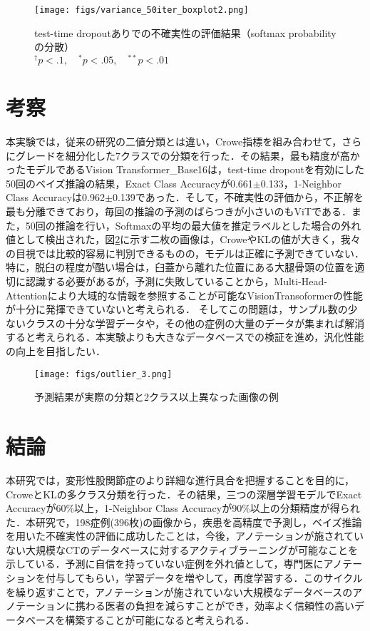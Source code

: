 \documentclass[technicalreport]{ieicej}
\begin{document}
\begin{figure}[h]
\capwidth=60mm
\vspace{50mm}
\texttt{[image: figs/variance\_50iter\_boxplot2.png]}
\caption{test-time dropoutありでの不確実性の評価結果（softmax probabilityの分散）\\$^{\dagger}p<.1,\quad^{*}p<.05,\quad^{**}p<.01$}
\label{fig:total_boxplot2}
\end{figure}

\section{考察}
本実験では，従来の研究の二値分類とは違い，Crowe指標を組み合わせて，さらにグレードを細分化した7クラスでの分類を行った．その結果，最も精度が高かったモデルであるVision Transformer\_Base16は，test-time dropoutを有効にした50回のベイズ推論の結果，Exact Class Accuracyが0.661$\pm$0.133，1-Neighbor Class Accuracyは0.962$\pm$0.139であった．そして，不確実性の評価から，不正解を最も分離できており，毎回の推論の予測のばらつきが小さいのもViTである．また，50回の推論を行い，Softmaxの平均の最大値を推定ラベルとした場合の外れ値として検出された，図\ref{fig:outlier}に示す二枚の画像は，CroweやKLの値が大きく，我々の目視では比較的容易に判別できるものの，モデルは正確に予測できていない．特に，脱臼の程度が酷い場合は，臼蓋から離れた位置にある大腿骨頭の位置を適切に認識する必要があるが，予測に失敗していることから，Multi-Head-Attentionにより大域的な情報を参照することが可能\cite{cordonnier2019relationship}なVisionTransoformerの性能が十分に発揮できていないと考えられる．
そしてこの問題は，サンプル数の少ないクラスの十分な学習データや，その他の症例の大量のデータが集まれば解消すると考えられる．本実験よりも大きなデータベースでの検証を進め，汎化性能の向上を目指したい．

\begin{figure}[h]
\capwidth=60mm
\vspace{35mm}
\texttt{[image: figs/outlier\_3.png]}
\caption{予測結果が実際の分類と2クラス以上異なった画像の例}
\label{fig:outlier}
\end{figure}

\section{結論}
本研究では，変形性股関節症のより詳細な進行具合を把握することを目的に，CroweとKLの多クラス分類を行った．その結果，三つの深層学習モデルでExact Accuracyが60\%以上，1-Neighbor Class Accuracyが90\%以上の分類精度が得られた．本研究で，198症例(396枚)の画像から，疾患を高精度で予測し，ベイズ推論を用いた不確実性の評価に成功したことは，今後，アノテーションが施されていない大規模なCTのデータベースに対するアクティブラーニングが可能なことを示している．予測に自信を持っていない症例を外れ値として，専門医にアノテーションを付与してもらい，学習データを増やして，再度学習する．このサイクルを繰り返すことで，アノテーションが施されていない大規模なデータベースのアノテーションに携わる医者の負担を減らすことができ，効率よく信頼性の高いデータベースを構築することが可能になる\cite{10.5555/3305381.3305504}と考えられる．
\end{document}
